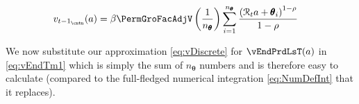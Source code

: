 \documentclass[titlepage, headings=optiontotocandhead]{Resources/texmf-local/tex/latex/econtex}
\begin{document}
\lstset{basicstyle=\ttfamily\footnotesize,breaklines=true,language=Python,frame=single}
\nopagebreak

  \begin{equation}\begin{gathered}\begin{aligned}
        v_{{t-1}_\cntn}(a)  & =   \beta \PermGroFacAdjV\left(\frac{1}{n_{\pmb{\theta}}}\right)\sum_{i=1}^{n_{\pmb{\theta}}}   \frac{\left(\mathcal{R}_{t} a + \pmb{\theta}_{i}\right)^{1-\rho}}{1-\rho} \label{eq:vDiscrete}
      \end{aligned}\end{gathered}\end{equation}

We now substitute our approximation \eqref{eq:vDiscrete} for $\vEndPrdLsT(a)$ in \eqref{eq:vEndTm1} which is simply the sum of $n_{\pmb{\theta}}$ numbers and is therefore easy to calculate (compared to the full-fledged numerical integration \eqref{eq:NumDefInt} that it replaces).




\begin{comment}
  In the {\SMDSOPntbk} notebook, the section ``Discretization of the Income Shock Distribution'' provides code that instantiates the \texttt{DiscreteApproximation} class defined in the \texttt{resources} module. This class creates a 7-point discretization of the continuous log-normal distribution of transitory shocks to income by utilizing seven points, where the mean value is $-.5 \sigma^2$, and the standard deviation is $\sigma = .5$.

  A close look at the \texttt{DiscreteApproximation} class and its subclasses should convince you that the code is simply a computational implementation of the mathematical description of equiprobable discrete approximation in this section. Moreover, the Python code generates a graph of the discretized distribution depicted in \ref{fig:discreteapprox}.
\end{comment}
\end{document}
